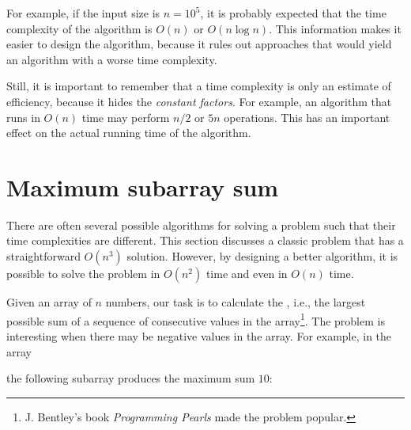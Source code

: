 For example, if the input size is $n=10^5$,
it is probably expected that the time
complexity of the algorithm is $O(n)$ or $O(n \log n)$.
This information makes it easier to design the algorithm,
because it rules out approaches that would yield
an algorithm with a worse time complexity.


Still, it is important to remember that a
time complexity is only an estimate of efficiency,
because it hides the \emph{constant factors}.
For example, an algorithm that runs in $O(n)$ time
may perform $n/2$ or $5n$ operations.
This has an important effect on the actual
running time of the algorithm.

\section{Maximum subarray sum}


There are often several possible algorithms
for solving a problem such that their
time complexities are different.
This section discusses a classic problem that
has a straightforward $O(n^3)$ solution.
However, by designing a better algorithm, it
is possible to solve the problem in $O(n^2)$
time and even in $O(n)$ time.

Given an array of $n$ numbers,
our task is to calculate the
, i.e.,
the largest possible sum of 
a sequence of consecutive values
in the array\footnote{J. Bentley's
book \emph{Programming Pearls} \cite{ben86} made the problem popular.}.
The problem is interesting when there may be
negative values in the array.
For example, in the array
\begin{center}
\end{center}
\begin{samepage}
the following subarray produces the maximum sum $10$:
\begin{center}
\end{center}
\end{samepage}


